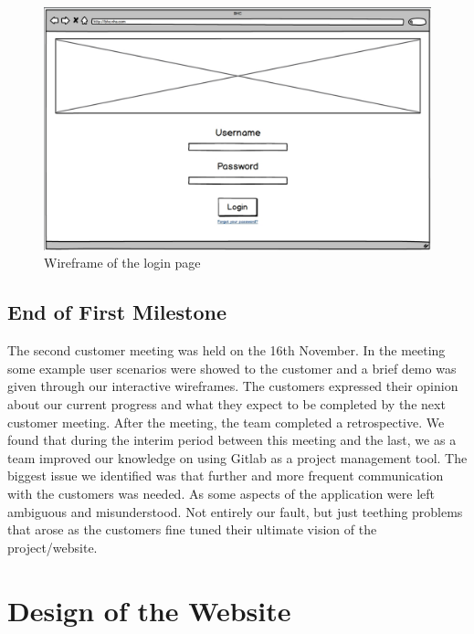 \documentclass{l3proj}
\begin{document}
\begin{figure}[ht]
\centerline{\includegraphics[width=\textwidth, height=\textheight, keepaspectratio]{wireframe.png}}
\caption{Wireframe of the login page}
\label{fig:initialWireframe}
\end{figure}

\subsection{End of First Milestone}
\label{sec:milestone1}

The second customer meeting was held on the 16th November. In the meeting some example user scenarios were showed to the customer and a brief demo was given through our interactive wireframes. The customers expressed their opinion about our current progress and what they expect to be completed by the next customer meeting. After the meeting, the team completed a retrospective. We found that during the interim period between this meeting and the last, we as a team improved our knowledge on using Gitlab as a project management tool. The biggest issue we identified was that further and more frequent communication with the customers was needed. As some aspects of the application were left ambiguous and misunderstood. Not entirely our fault, but just teething problems that arose as the customers fine tuned their ultimate vision of the project/website.

\section{Design of the Website}
\label{sec:design}
\end{document}
